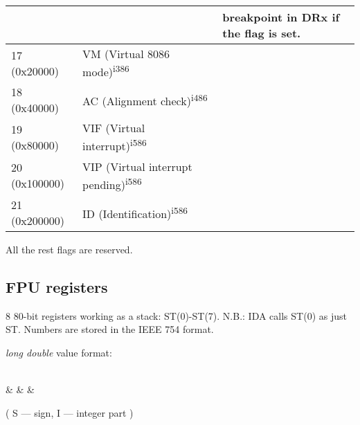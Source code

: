\begin{center}
\begin{tabular}{ | l | l | l | }
	     &                  & breakpoint in DRx if the flag is set. \\
\hline
17 (0x20000) & VM (Virtual 8086 mode)\textsuperscript{i386} & \\
\hline
18 (0x40000) & AC (Alignment check)\textsuperscript{i486} & \\
\hline
19 (0x80000) & VIF (Virtual interrupt)\textsuperscript{i586} & \\
\hline
20 (0x100000) & VIP (Virtual interrupt pending)\textsuperscript{i586} & \\
\hline
21 (0x200000) & ID (Identification)\textsuperscript{i586} & \\
\hline
\end{tabular}
\end{center}
\normalsize

All the rest flags are reserved.

\subsection{FPU registers}

8 80-bit registers working as a stack: ST(0)-ST(7).
N.B.: \ac{IDA} calls ST(0) as just ST.
Numbers are stored in the IEEE 754 format.

\emph{long double} value format:

\bigskip
\begin{center}
\begingroup
\makeatletter
\let\saved@bf@bitformatting\bf@bitformatting
\renewcommand*{\bf@bitformatting}{%
	\ifnum\value{header@val}=21 %
	\value{header@val}=62 %
	\else\ifnum\value{header@val}=22 %
	\value{header@val}=63 %
	\else\ifnum\value{header@val}=23 %
	\value{header@val}=64 %
	\else\ifnum\value{header@val}=30 %
	\value{header@val}=78 %
	\else\ifnum\value{header@val}=31 %
	\value{header@val}=79 %
	\fi\fi\fi\fi\fi
	\saved@bf@bitformatting
}%
\begin{bytefield}[bitwidth=0.03\linewidth]{32}
	 \\
	 &
	 &
	 &
\end{bytefield}
\endgroup
\end{center}

\begin{center}
( S --- sign, I --- integer part )
\end{center}

